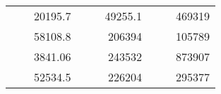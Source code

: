 \begin{table}[]
\begin{tabular}{|ccrccrccc}
\rowcolor[HTML]{DDFDFF} 
\multicolumn{1}{|c|}{\cellcolor[HTML]{FFFFC7}}                                & \multicolumn{1}{c|}{\cellcolor[HTML]{DDFDFF}}                      & \multicolumn{1}{r|}{\cellcolor[HTML]{DAE8FC}20195.7}   & \multicolumn{1}{c|}{\cellcolor[HTML]{FFFFC7}}                                & \multicolumn{1}{c|}{\cellcolor[HTML]{DDFDFF}}                       & \multicolumn{1}{r|}{\cellcolor[HTML]{DDFDFF}49255.1}   & \multicolumn{1}{c|}{\cellcolor[HTML]{FFFFC7}}                                & \multicolumn{1}{c|}{\cellcolor[HTML]{DDFDFF}}                      & \multicolumn{1}{r|}{\cellcolor[HTML]{DDFDFF}469319}    \\ \cline{3-3} \cline{6-6} \cline{9-9} 
\multicolumn{1}{|c|}{\cellcolor[HTML]{FFFFC7}}                                & \multicolumn{1}{c|}{\cellcolor[HTML]{DDFDFF}}                      & \multicolumn{1}{r|}{\cellcolor[HTML]{DDFDFF}58108.8}   & \multicolumn{1}{c|}{\cellcolor[HTML]{FFFFC7}}                                & \multicolumn{1}{c|}{\cellcolor[HTML]{DDFDFF}}                       & \multicolumn{1}{r|}{\cellcolor[HTML]{DAE8FC}206394}    & \multicolumn{1}{c|}{\cellcolor[HTML]{FFFFC7}}                                & \multicolumn{1}{c|}{\cellcolor[HTML]{DDFDFF}}                      & \multicolumn{1}{r|}{\cellcolor[HTML]{DAE8FC}105789}    \\ \cline{3-3} \cline{6-6} \cline{9-9} 
\rowcolor[HTML]{DDFDFF} 
\multicolumn{1}{|c|}{\cellcolor[HTML]{FFFFC7}}                                & \multicolumn{1}{c|}{\cellcolor[HTML]{DDFDFF}}                      & \multicolumn{1}{r|}{\cellcolor[HTML]{DAE8FC}3841.06}   & \multicolumn{1}{c|}{\cellcolor[HTML]{FFFFC7}}                                & \multicolumn{1}{c|}{\cellcolor[HTML]{DDFDFF}}                       & \multicolumn{1}{r|}{\cellcolor[HTML]{DDFDFF}243532}    & \multicolumn{1}{c|}{\cellcolor[HTML]{FFFFC7}}                                & \multicolumn{1}{c|}{\cellcolor[HTML]{DDFDFF}}                      & \multicolumn{1}{r|}{\cellcolor[HTML]{DDFDFF}873907}    \\ \cline{3-3} \cline{6-6} \cline{9-9} 
\multicolumn{1}{|c|}{\cellcolor[HTML]{FFFFC7}}                                & \multicolumn{1}{c|}{\cellcolor[HTML]{DDFDFF}}                      & \multicolumn{1}{r|}{\cellcolor[HTML]{DDFDFF}52534.5}   & \multicolumn{1}{c|}{\cellcolor[HTML]{FFFFC7}}                                & \multicolumn{1}{c|}{\cellcolor[HTML]{DDFDFF}}                       & \multicolumn{1}{r|}{\cellcolor[HTML]{DAE8FC}226204}    & \multicolumn{1}{c|}{\cellcolor[HTML]{FFFFC7}}                                & \multicolumn{1}{c|}{\cellcolor[HTML]{DDFDFF}}                      & \multicolumn{1}{r|}{\cellcolor[HTML]{DAE8FC}295377}    \\ \cline{3-3} \cline{6-6} \cline{9-9} 

\end{tabular}
\end{table}
